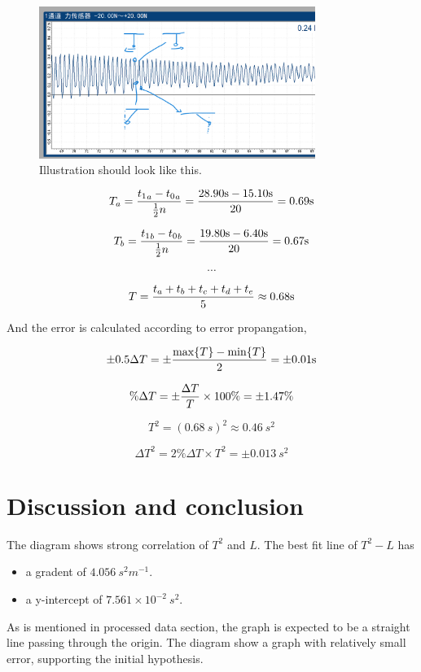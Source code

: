 \documentclass[a4paper]{article}
\begin{document}
\begin{figure}
    \centering
    \includegraphics[width=0.8\textwidth]{add.png}
    \caption{Illustration should look like this.}
\end{figure}

$$T_a = {{t_1}_a - {t_0}_a \over \frac{1}{2}n} = {28.90 \SI{}{s} - 15.10 \SI{}{s} \over 20} = 0.69 \SI{}{s}$$

$$T_b = {{t_1}_b - {t_0}_b \over \frac{1}{2}n} ={ 19.80 \SI{}{s} - 6.40 \SI{}{s} \over 20} = 0.67 \SI{}{s}$$

$$\cdots$$

$$T = {t_a + t_b + t_c + t_d + t_e \over 5} \approx 0.68 \SI{}{s}$$

And the error is calculated according to error propangation,

$$\pm 0.5 \Delta T = \pm {\max\{T\} - \min\{T\} \over 2} = \pm 0.01 \SI{}{s}$$

$$\%\Delta T = \pm {\Delta T \over T} \times 100\% = \pm 1.47\%$$

$$T^2 = (0.68 \SI{}{s})^2 \approx 0.46 \SI{}{s^2}$$

$$\Delta T^2 = 2\%\Delta T \times T^2 = \pm 0.013 \SI{}{s^2}$$

\section{Discussion and conclusion}

The diagram shows strong correlation of $T^2$ and $L$. The best fit line of $T^2 - L$ has 

\begin{itemize}
    \item a gradent of $4.056 \SI{}{s^2m^{-1}}$.
    \item a y-intercept of $7.561\times 10^{-2} \SI{}{s^2}$.
\end{itemize}

As is mentioned in processed data section, the graph is expected to be a straight line passing through the origin. The diagram show a graph with relatively small error, supporting the initial hypothesis. 
\end{document}
